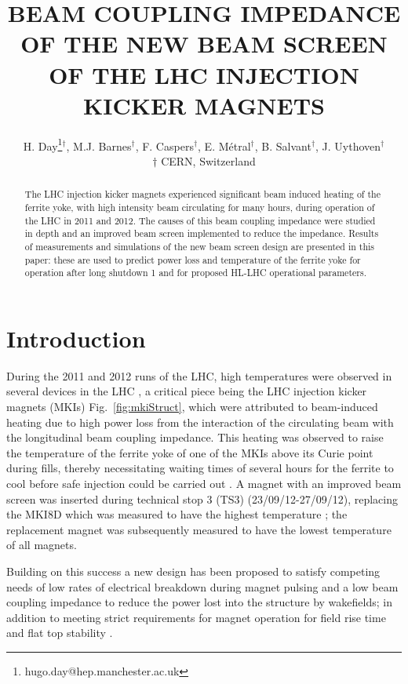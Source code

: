 \documentclass[a4paper,
              ]{jacow}
\begin{document}
\title{BEAM COUPLING IMPEDANCE OF THE NEW BEAM SCREEN OF THE LHC INJECTION KICKER MAGNETS}
\author{H. Day\thanks{hugo.day@hep.manchester.ac.uk}$^{\dagger}$, M.J. Barnes$^{\dagger}$, F. Caspers$^{\dagger}$, E. Métral$^{\dagger}$, B. Salvant$^{\dagger}$, J. Uythoven$^{\dagger}$ \\
$\dagger$ CERN, Switzerland
}

\maketitle 


\begin{abstract}
The LHC injection kicker magnets experienced significant beam induced heating of the ferrite yoke, with high intensity beam circulating for many hours, during operation of the LHC in 2011 and 2012. The causes of this beam coupling impedance were studied in depth and an improved beam screen implemented to reduce the impedance. Results of measurements and simulations of the new beam screen design are presented in this paper: these are used to predict power loss and temperature of the ferrite yoke for operation after long shutdown 1 and for proposed HL-LHC operational parameters.
\end{abstract}

\section{Introduction}

During the 2011 and 2012 runs of the LHC, high temperatures were observed in several devices in the LHC  \cite{metral_cham2012}, a critical piece being the LHC injection kicker magnets (MKIs) Fig.~\ref{fig:mkiStruct}, which were attributed to beam-induced heating due to high power loss from the interaction of the circulating beam with the longitudinal beam coupling impedance. This heating was observed to raise the temperature of the ferrite yoke of one of the MKIs above its Curie point during fills, thereby necessitating waiting times of several hours for the ferrite to cool before safe injection could be carried out \cite{mki-heating}. A magnet with an improved beam screen was inserted during technical stop 3 (TS3) (23/09/12-27/09/12), replacing the MKI8D which was measured to have the highest temperature \cite{mki-heatingTemp}; the replacement magnet was subsequently measured to have the lowest temperature of all magnets.

Building on this success a new design has been proposed to satisfy competing needs of low rates of electrical breakdown during magnet pulsing and a low beam coupling impedance to reduce the power lost into the structure by wakefields; in addition to meeting strict requirements for magnet operation for field rise time and flat top stability \cite{mkiUpgrade}. 
\end{document}
